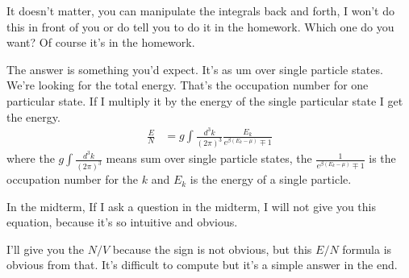 It doesn't matter,
you can manipulate the integrals back and forth,
I won't do this in front of you or do tell you to do it in the homework.
Which one do you want?
Of course it's in the homework.

The answer is something you'd expect.
It's as um over single particle states.
We're looking for the total energy.
That's the occupation number for one particular state.
If I multiply it by the energy of the single particular state I get the energy.
\begin{align}
    \frac{E}{N} &=
    g \int \frac{d^3k}{(2\pi)^3}
    \frac{E_k}{e^{\beta\left( E_k - \mu \right)} \mp 1}
\end{align}
where the  $g \int \frac{d^3k}{(2\pi)^3}$ means sum over single particle states,
the $\frac{1}{e^{\beta\left( E_k - \mu \right)} \mp 1}$ is the occupation number
for the $k$ and $E_k$ is the energy of a single particle.

In the midterm,
If I ask a question in the midterm,
I will not give you this equation,
because it's so intuitive and obvious.

I'll give you the $N/V$ because the sign is not obvious,
but this $E/N$ formula is obvious from that.
It's difficult to compute but it's a simple answer in the end.
